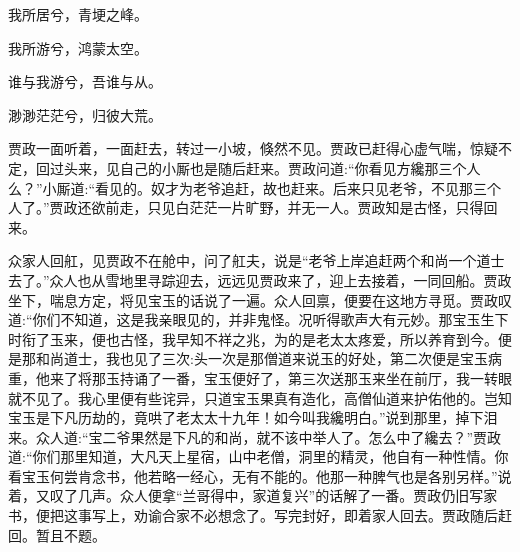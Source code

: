 \begin{poem}

    \begin{pl}
        我所居兮，青埂之峰。
    \end{pl}


    \begin{pl}
        我所游兮，鸿蒙太空。
    \end{pl}


    \begin{pl}
        谁与我游兮，吾谁与从。
    \end{pl}


    \begin{pl}
        渺渺茫茫兮，归彼大荒。
    \end{pl}
\end{poem}


\begin{parag}
    贾政一面听着，一面赶去，转过一小坡，倏然不见。贾政已赶得心虚气喘，惊疑不定，回过头来，见自己的小厮也是随后赶来。贾政问道:“你看见方纔那三个人么？”小厮道:“看见的。奴才为老爷追赶，故也赶来。后来只见老爷，不见那三个人了。”贾政还欲前走，只见白茫茫一片旷野，并无一人。贾政知是古怪，只得回来。
\end{parag}


\begin{parag}
    众家人回舡，见贾政不在舱中，问了舡夫，说是“老爷上岸追赶两个和尚一个道士去了。”众人也从雪地里寻踪迎去，远远见贾政来了，迎上去接着，一同回船。贾政坐下，喘息方定，将见宝玉的话说了一遍。众人回禀，便要在这地方寻觅。贾政叹道:“你们不知道，这是我亲眼见的，并非鬼怪。况听得歌声大有元妙。那宝玉生下时衔了玉来，便也古怪，我早知不祥之兆，为的是老太太疼爱，所以养育到今。便是那和尚道士，我也见了三次:头一次是那僧道来说玉的好处，第二次便是宝玉病重，他来了将那玉持诵了一番，宝玉便好了，第三次送那玉来坐在前厅，我一转眼就不见了。我心里便有些诧异，只道宝玉果真有造化，高僧仙道来护佑他的。岂知宝玉是下凡历劫的，竟哄了老太太十九年！如今叫我纔明白。”说到那里，掉下泪来。众人道:“宝二爷果然是下凡的和尚，就不该中举人了。怎么中了纔去？”贾政道:“你们那里知道，大凡天上星宿，山中老僧，洞里的精灵，他自有一种性情。你看宝玉何尝肯念书，他若略一经心，无有不能的。他那一种脾气也是各别另样。”说着，又叹了几声。众人便拿“兰哥得中，家道复兴”的话解了一番。贾政仍旧写家书，便把这事写上，劝谕合家不必想念了。写完封好，即着家人回去。贾政随后赶回。暂且不题。
\end{parag}


